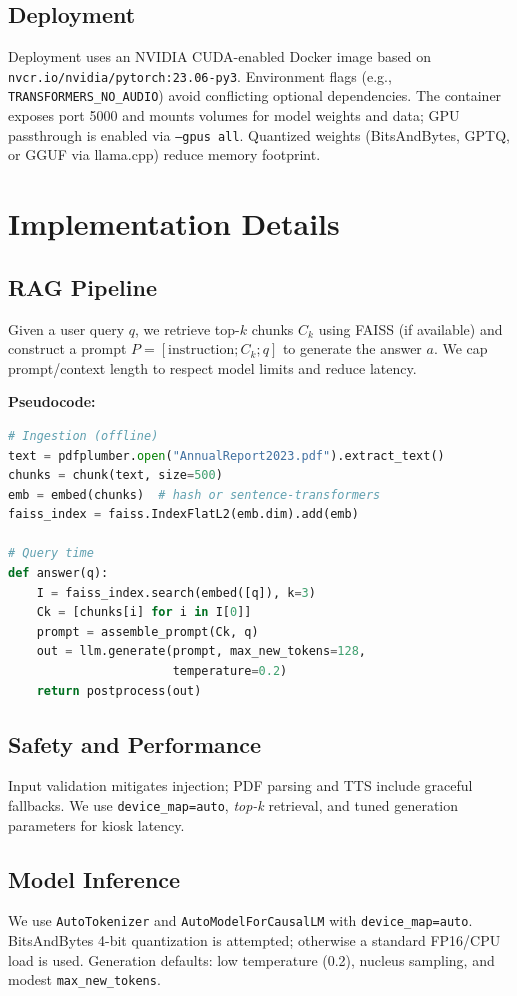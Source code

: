 \documentclass[conference]{IEEEtran}
\begin{document}
\subsection{Deployment}
Deployment uses an NVIDIA CUDA-enabled Docker image based on \texttt{nvcr.io/nvidia/pytorch:23.06-py3}. Environment flags (e.g., \texttt{TRANSFORMERS\_NO\_AUDIO}) avoid conflicting optional dependencies. The container exposes port 5000 and mounts volumes for model weights and data; GPU passthrough is enabled via \texttt{--gpus all}. Quantized weights (BitsAndBytes, GPTQ, or GGUF via llama.cpp) reduce memory footprint.

\section{Implementation Details}
\subsection{RAG Pipeline}
Given a user query $q$, we retrieve top-$k$ chunks $C_k$ using FAISS (if available) and construct a prompt $P=[\text{instruction}; C_k; q]$ to generate the answer $a$. We cap prompt/context length to respect model limits and reduce latency.

\noindent\textbf{Pseudocode:}
\begin{lstlisting}[language=Python,basicstyle=\ttfamily\small]
# Ingestion (offline)
text = pdfplumber.open("AnnualReport2023.pdf").extract_text()
chunks = chunk(text, size=500)
emb = embed(chunks)  # hash or sentence-transformers
faiss_index = faiss.IndexFlatL2(emb.dim).add(emb)

# Query time
def answer(q):
    I = faiss_index.search(embed([q]), k=3)
    Ck = [chunks[i] for i in I[0]]
    prompt = assemble_prompt(Ck, q)
    out = llm.generate(prompt, max_new_tokens=128,
                       temperature=0.2)
    return postprocess(out)
\end{lstlisting}

\subsection{Safety and Performance}
Input validation mitigates injection; PDF parsing and TTS include graceful fallbacks. We use \texttt{device\_map=auto}, \emph{top-k} retrieval, and tuned generation parameters for kiosk latency.

\subsection{Model Inference}
We use \texttt{AutoTokenizer} and \texttt{AutoModelForCausalLM} with \texttt{device\_map=auto}. BitsAndBytes 4-bit quantization is attempted; otherwise a standard FP16/CPU load is used. Generation defaults: low temperature (0.2), nucleus sampling, and modest \texttt{max\_new\_tokens}.
\end{document}

